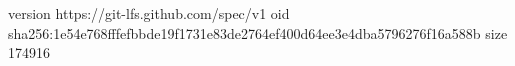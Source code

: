 version https://git-lfs.github.com/spec/v1
oid sha256:1e54e768fffefbbde19f1731e83de2764ef400d64ee3e4dba5796276f16a588b
size 174916

